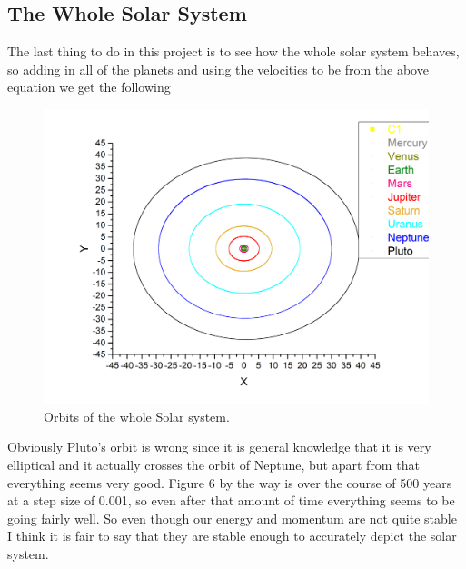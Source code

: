 \documentclass[12pt,righttag]{article}
\begin{document}
\subsection{The Whole Solar System}
	The last thing to do in this project is to see how the whole solar system behaves, so adding in all of the planets and using the velocities to be from the above equation we get the following
	

	\begin{figure}
		\begin{center}
		\includegraphics[scale=0.35]{Graph21.png}
			\caption{\label{SolarSystem} Orbits of the whole Solar system. }
			\end{center}
		\end{figure}
	
		Obviously Pluto's orbit is wrong since it is general knowledge that it is very elliptical and it actually crosses the orbit of Neptune, but apart from that everything seems very good. Figure 6 by the way is over the course of 500 years at a step size of 0.001, so even after that amount of time everything seems to be going fairly well. So even though our energy and momentum are not quite stable I think it is fair to say that they are stable enough to accurately depict the solar system.
		
\end{document}
